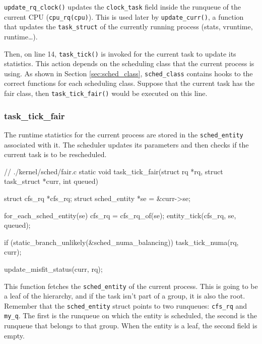 \verb|update_rq_clock()| updates the \verb|clock_task| field inside the runqueue of the current CPU (\verb|cpu_rq(cpu)|). This is used later by \verb|update_curr()|, a function that updates the \verb|task_struct| of the currently running process (stats, vruntime, runtime\dots).

Then, on line 14, \verb|task_tick()| is invoked for the current task to update its statistics. This action depends on the scheduling class that the current process is using. As shown in Section \ref{sec:sched_class}, \verb|sched_class| contains hooks to the correct functions for each scheduling class. Suppose that the current task has the fair class, then \verb|task_tick_fair()| would be executed on this line.

\subsubsection{task\_tick\_fair}

The runtime statistics for the current process are stored in the \verb|sched_entity| associated with it. The scheduler updates its parameters and then checks if the current task is to be rescheduled. 

\begin{code}
// ./kernel/sched/fair.c
static void task_tick_fair(struct rq *rq, struct task_struct *curr, int queued)
{
	struct cfs_rq *cfs_rq;
	struct sched_entity *se = &curr->se;

	for_each_sched_entity(se) {
		cfs_rq = cfs_rq_of(se);
		entity_tick(cfs_rq, se, queued);
	}

	if (static_branch_unlikely(&sched_numa_balancing))
		task_tick_numa(rq, curr);

	update_misfit_status(curr, rq);
}
\end{code}
This function fetches the \verb|sched_entity| of the current process. This is going to be a leaf of the hierarchy, and if the task isn't part of a group, it is also the root. Remember that the \verb|sched_entity| struct points to two runqueues: \verb|cfs_rq| and \verb|my_q|. The first is the runqueue on which the entity is scheduled, the second is the runqueue that belongs to that group. When the entity is a leaf, the second field is empty. 

